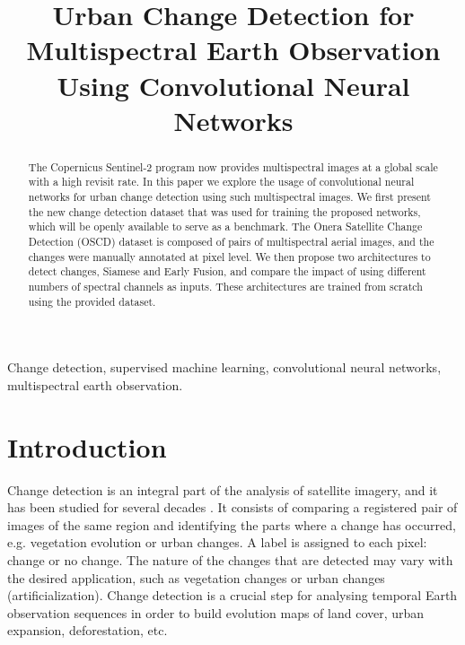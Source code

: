 \documentclass{article}
\title{Urban Change Detection for Multispectral Earth Observation \\ Using Convolutional Neural Networks}
\begin{document}
\maketitle

\begin{abstract}


The Copernicus Sentinel-2 program now provides multispectral images at a global scale with a high revisit rate. In this paper we explore the usage of convolutional neural networks for urban change detection using such multispectral images. We first present the new change detection dataset that was used for training the proposed networks, which will be openly available to serve as a benchmark. The Onera Satellite Change Detection (OSCD) dataset is composed of pairs of multispectral aerial images, and the changes were manually annotated at pixel level. 
We then propose two architectures to detect changes, Siamese and Early Fusion, and compare the impact of using different numbers of spectral channels as inputs.
These architectures are trained from scratch using the provided dataset.


\end{abstract}
%
\begin{keywords}
Change detection, supervised machine learning, convolutional neural networks, multispectral earth observation.
\end{keywords}

\section{Introduction}
\label{sec:intro}

Change detection is an integral part of the analysis of satellite imagery, and it has been studied for several decades \cite{hussain2013change,singh1989review}. It consists of comparing a registered pair of images of the same region and identifying the parts where a change has occurred, e.g. vegetation evolution or urban changes. A label is assigned to each pixel: change or no change. The nature of the changes that are detected may vary with the desired application, such as vegetation changes or urban changes (artificialization). Change detection is a crucial step for analysing temporal Earth observation sequences in order to build evolution maps of land cover, urban expansion, deforestation, etc.
\end{document}
